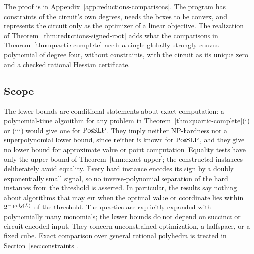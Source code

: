 The proof is in Appendix~\ref{app:reductions-comparisons}. The program has
constraints of the circuit's own degrees, needs the boxes to be convex, and
represents the circuit only as the optimizer of a linear objective. The
realization of Theorem~\ref{thm:reductions-signed-root} adds what the
comparisons in Theorem~\ref{thm:quartic-complete} need: a single globally
strongly convex polynomial of degree four, without constraints, with the
circuit as its unique zero and a checked rational Hessian certificate.

\subsection{Scope}
\label{sec:reductions-scope}

The lower bounds are conditional statements about exact computation: a
polynomial-time algorithm for any problem in Theorem~\ref{thm:quartic-complete}(i)
or (iii) would give one for $\mathrm{PosSLP}$. They imply neither NP-hardness nor a
superpolynomial lower bound, since neither is known for $\mathrm{PosSLP}$, and they give
no lower bound for approximate value or point computation. Equality tests have only the upper bound of
Theorem~\ref{thm:exact-upper}; the constructed instances deliberately avoid
equality. Every hard instance encodes its sign by a doubly exponentially small
signal, so no inverse-polynomial separation of the hard instances from the
threshold is asserted. In particular, the results say nothing about
algorithms that may err when the optimal value or coordinate lies within
$2^{-\operatorname{poly}(L)}$ of the threshold. The quartics are explicitly expanded with polynomially
many monomials; the lower bounds do not depend on succinct or circuit-encoded
input. They concern unconstrained optimization, a halfspace, or a fixed cube.
Exact comparison over general rational polyhedra is treated in
Section~\ref{sec:constraints}.
